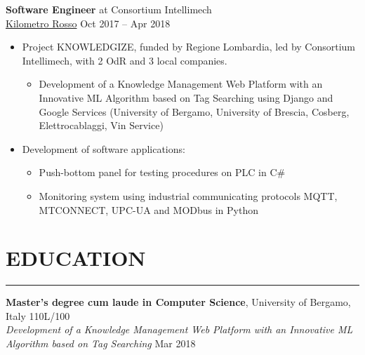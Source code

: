 \documentclass[10pt]{article}
\newcommand{\cvsection}[1]{\section*{\centering\normalsize\uppercase{#1}}\vspace{-16pt}\rule{\linewidth}{0.2pt}\vspace{6pt}}
\begin{document}
\vspace{6pt} %
\textbf{Software Engineer} at Consortium Intellimech\\
\href{https://www.linkedin.com/company/kilometro-rosso/}{Kilometro Rosso} \hfill Oct 2017 – Apr 2018
\begin{itemize}
  	\setlength\itemsep{-0.5em}
	\renewcommand\labelitemii{$\vcenter{\hbox{\tiny$\bullet$}}$}
	\item Project KNOWLEDGIZE, funded by Regione Lombardia, led by Consortium Intellimech, with 2 OdR and 3 local companies.
	\vspace{-6pt}
  	\begin{itemize}
  		\setlength\itemsep{-0.5em}
		\item Development of a Knowledge Management Web Platform with an Innovative ML Algorithm based on Tag Searching using Django and Google Services (University of Bergamo, University of Brescia, Cosberg, Elettrocablaggi, Vin Service)
	\end{itemize}
	\item Development of software applications:
	\vspace{-6pt}
  	\begin{itemize}
  		\setlength\itemsep{-0.5em}
		\item Push-bottom panel for testing procedures on PLC in C\#
		\item Monitoring system using industrial communicating protocols MQTT, MTCONNECT, UPC-UA and MODbus in Python
	\end{itemize}
\end{itemize}


\cvsection{education}
\textbf{Master's degree cum laude in Computer Science}, University of Bergamo, Italy \hfill 110L\slash100 \\
\textit{Development of a Knowledge Management Web Platform with an Innovative ML Algorithm based on Tag Searching} \hfill Mar 2018

\vspace{6pt} %
\end{document}
